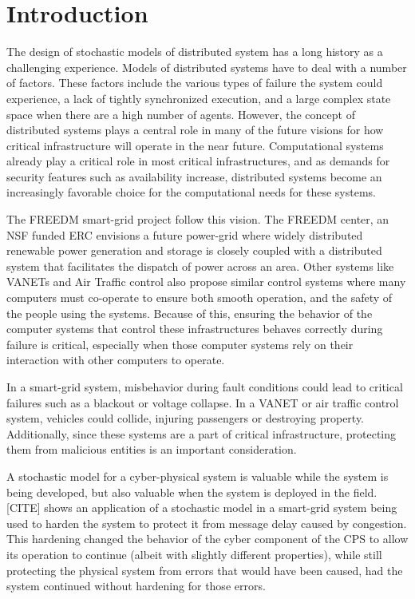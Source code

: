 \section{Introduction}

The design of stochastic models of distributed system has a long history as a challenging experience. Models of distributed systems have to deal with a number of factors. These factors include the various types of failure the system could experience, a lack of tightly synchronized execution, and a large complex state space when there are a high number of agents.  However, the concept of distributed systems plays a central role in many of the future visions for how critical infrastructure will operate in the near future. Computational systems already play a critical role in most critical infrastructures, and as demands for security features such as availability increase, distributed systems become an increasingly favorable choice for the computational needs for these systems.

The FREEDM smart-grid project follow this vision. The FREEDM center, an NSF funded ERC envisions a future power-grid where widely distributed renewable power generation and storage is closely coupled with a distributed system that facilitates the dispatch of power across an area. Other systems like VANETs and Air Traffic control also propose similar control systems where many computers must co-operate to ensure both smooth operation, and the safety of the people using the systems. Because of this, ensuring the behavior of the computer systems that control these infrastructures behaves correctly during failure is critical, especially when those computer systems rely on their interaction with other computers to operate.

In a smart-grid system, misbehavior during fault conditions could lead to critical failures such as a blackout or voltage collapse. In a VANET or air traffic control system, vehicles could collide, injuring passengers or destroying property. Additionally, since these systems are a part of critical infrastructure, protecting them from malicious entities is an important consideration.

A stochastic model for a cyber-physical system is valuable while the system is being developed, but also valuable when the system is deployed in the field. [CITE] shows an application of a stochastic model in a smart-grid system being used to harden the system to protect it from message delay caused by congestion. This hardening changed the behavior of the cyber component of the CPS to allow its operation to continue (albeit with slightly different properties), while still protecting the physical system from errors that would have been caused, had the system continued without hardening for those errors.

